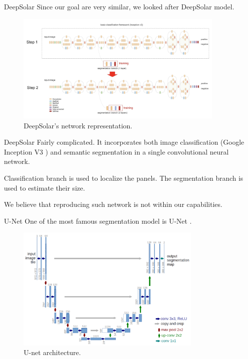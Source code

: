 \documentclass[12pt]{beamer}
\begin{document}
\begin{frame}{DeepSolar}
    Since our goal are very similar, we looked after \alert{DeepSolar} \cite{yu2018deepsolar} model.
    
    \begin{figure}
        \centering
        \includegraphics[width=0.9\textwidth]{resources/jpg/cnn_arch.jpg}
        \caption{DeepSolar's network representation. \cite{yu2018deepsolar}}
    \end{figure}

\end{frame}

\begin{frame}{DeepSolar}
    Fairly complicated.  It incorporates \alert{both} image classification (Google Inception V3 \cite{szegedy2016rethinking}) and semantic segmentation in a single convolutional neural network.
    
    Classification branch is used to localize the panels. The segmentation branch is used to estimate their size.
    
    We believe that reproducing such network is not within our capabilities.
\end{frame}

\begin{frame}{U-Net}
    One of the most famous segmentation model is U-Net \cite{ronneberger2015u}.
    
    \begin{figure}
        \centering
        \includegraphics[width=0.8\textwidth]{resources/png/unet.png}
        \caption{U-net architecture. \cite{ronneberger2015u}}
    \end{figure}
\end{frame}
\end{document}
